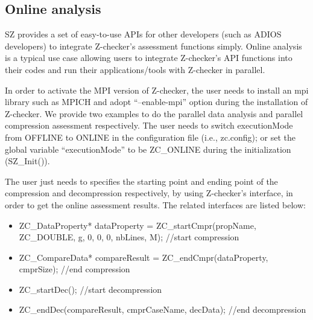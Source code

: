 \subsection{Online analysis}

SZ provides a set of easy-to-use APIs for other developers (such as ADIOS developers) to integrate Z-checker's assessment functions simply. Online analysis is a typical use case allowing users to integrate Z-checker's API functions into their codes and run their applications/tools with Z-checker in parallel.

In order to activate the MPI version of Z-checker, the user needs to install an mpi library such as MPICH and adopt ``--enable-mpi'' option during the installation of Z-checker. We provide two examples to do the parallel data analysis and parallel compression assessment respectively. The user needs to switch executionMode from OFFLINE to ONLINE in the configuration file (i.e., zc.config); or set the global variable ``executionMode'' to be ZC\_ONLINE during the initialization (SZ\_Init()).

The user just needs to specifies the starting point and ending point of the compression and decompression respectively, by using Z-checker's interface, in order to get the online assessment results. The related interfaces are listed below:
\begin{itemize}
  \item ZC\_DataProperty* dataProperty = ZC\_startCmpr(propName, ZC\_DOUBLE, g, 0, 0, 0, nbLines, M); //start compression
  \item ZC\_CompareData* compareResult = ZC\_endCmpr(dataProperty, cmprSize); //end compression
  \item ZC\_startDec(); //start decompression
  \item ZC\_endDec(compareResult, cmprCaseName, decData); //end decompression
\end{itemize}

